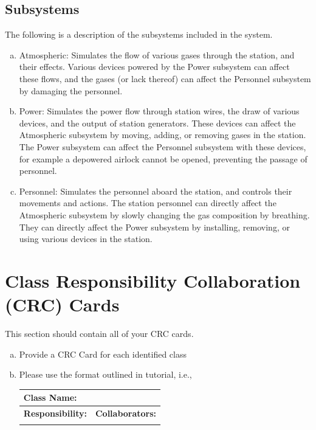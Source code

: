 \documentclass[]{article}
\begin{document}
\subsection{Subsystems}
\label{sub:subsystems}
The following is a description of the subsystems included in the system.
\begin{enumerate}[a)]
	\item Atmospheric: Simulates the flow of various gases through the station, and their effects. Various devices powered by the Power subsystem can affect these flows, and the gases (or lack thereof) can affect the Personnel subsystem by damaging the personnel.
	\item Power: Simulates the power flow through station wires, the draw of various devices, and the output of station generators. These devices can affect the Atmospheric subsystem by moving, adding, or removing gases in the station. The Power subsystem can affect the Personnel subsystem with these devices, for example a depowered airlock cannot be opened, preventing the passage of personnel.
	\item Personnel: Simulates the personnel aboard the station, and controls their movements and actions. The station personnel can directly affect the Atmospheric subsystem by slowly changing the gas composition by breathing. They can directly affect the Power subsystem by installing, removing, or using various devices in the station.
\end{enumerate}

\section{Class Responsibility Collaboration (CRC) Cards}
\label{sec:class_responsibility_collaboration_crc_cards}
This section should contain all of your CRC cards.

\begin{enumerate}[a)]
	\item Provide a CRC Card for each identified class
	\item Please use the format outlined in tutorial, i.e., 
	\begin{table}[ht]
		\centering
		\begin{tabular}{|p{5cm}|p{5cm}|}
		\hline 
		 \multicolumn{2}{|l|}{\textbf{Class Name:}} \\
		\hline
		\textbf{Responsibility:} & \textbf{Collaborators:} \\
		\hline
		\vspace{1in} & \\
		\hline
		\end{tabular}
	\end{table}
	
\end{enumerate}
\end{document}
